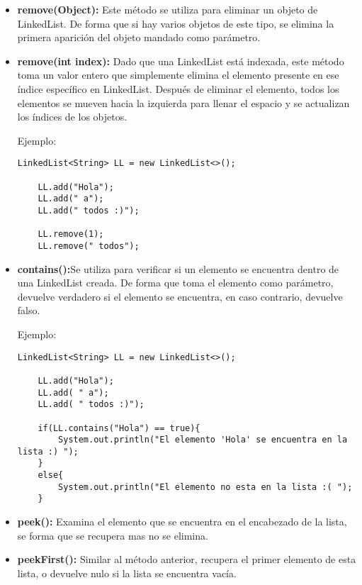\documentclass[12pt, letterpaper]{article} %
\begin{document}
\begin{itemize}
    \item \textbf{remove(Object):} Este método se utiliza para eliminar un objeto de LinkedList. De forma que si hay varios objetos de este tipo, se elimina la primera aparición del objeto mandado como parámetro.
    
    \item \textbf{remove(int index):} Dado que una LinkedList está indexada, este método toma un valor entero que simplemente elimina el elemento presente en ese índice específico en LinkedList. Después de eliminar el elemento, todos los elementos se mueven hacia la izquierda para llenar el espacio y se actualizan los índices de los objetos.

    Ejemplo:
    \lstset{language = Java, breaklines=true, basicstyle=\footnotesize}
    \begin{lstlisting}[frame=single]
    LinkedList<String> LL = new LinkedList<>();

    LL.add("Hola");  
    LL.add(" a");
    LL.add(" todos :)");

    LL.remove(1);
    LL.remove(" todos");
    \end{lstlisting}
    
    \item \textbf{contains():}Se utiliza para verificar si un elemento se encuentra dentro de una LinkedList creada. De forma que toma el elemento como parámetro, devuelve verdadero si el elemento se encuentra, en caso contrario, devuelve falso.

    Ejemplo:
    \lstset{language = Java, breaklines=true, basicstyle=\footnotesize}
    \begin{lstlisting}[frame=single]
    LinkedList<String> LL = new LinkedList<>();

    LL.add("Hola");  
    LL.add( " a");
    LL.add( " todos :)");

    if(LL.contains("Hola") == true){
        System.out.println("El elemento 'Hola' se encuentra en la lista :) ");
    }
    else{
    	System.out.println("El elemento no esta en la lista :( ");
    }
    \end{lstlisting}
    
    \item \textbf{peek():} Examina el elemento que se encuentra en el encabezado de la lista, se forma que se recupera mas no se elimina.
    
    \item \textbf{peekFirst():} Similar al método anterior, recupera el primer elemento de esta lista, o devuelve nulo si la lista se encuentra vacía.
    

\end{itemize}
\end{document}
